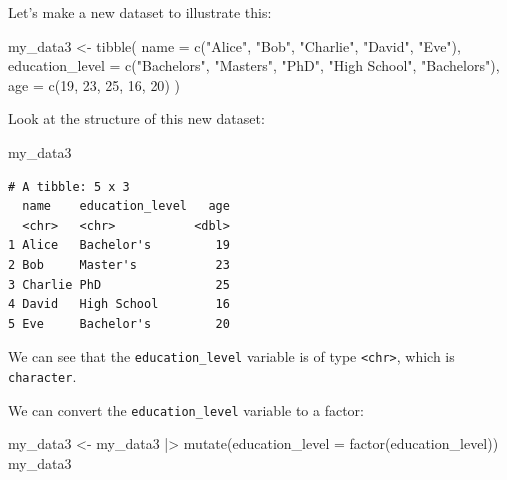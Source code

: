 \documentclass[
  letterpaper,
  8pt,
  a4paper]{book}
\newenvironment{Shaded}{\begin{snugshade}}{\end{snugshade}}
\newcommand{\AttributeTok}[1]{\textcolor[rgb]{0.40,0.45,0.13}{#1}}
\newcommand{\DecValTok}[1]{\textcolor[rgb]{0.68,0.00,0.00}{#1}}
\newcommand{\FunctionTok}[1]{\textcolor[rgb]{0.28,0.35,0.67}{#1}}
\newcommand{\NormalTok}[1]{\textcolor[rgb]{0.00,0.23,0.31}{#1}}
\newcommand{\OtherTok}[1]{\textcolor[rgb]{0.00,0.23,0.31}{#1}}
\newcommand{\SpecialCharTok}[1]{\textcolor[rgb]{0.37,0.37,0.37}{#1}}
\newcommand{\StringTok}[1]{\textcolor[rgb]{0.13,0.47,0.30}{#1}}
\begin{document}
Let's make a new dataset to illustrate this:

\begin{Shaded}
\begin{Highlighting}[]
\NormalTok{my\_data3 }\OtherTok{\textless{}{-}} \FunctionTok{tibble}\NormalTok{(}
  \AttributeTok{name =} \FunctionTok{c}\NormalTok{(}\StringTok{"Alice"}\NormalTok{, }\StringTok{"Bob"}\NormalTok{, }\StringTok{"Charlie"}\NormalTok{, }\StringTok{"David"}\NormalTok{, }\StringTok{"Eve"}\NormalTok{),}
  \AttributeTok{education\_level =} \FunctionTok{c}\NormalTok{(}\StringTok{"Bachelor\textquotesingle{}s"}\NormalTok{, }\StringTok{"Master\textquotesingle{}s"}\NormalTok{, }\StringTok{"PhD"}\NormalTok{, }\StringTok{"High School"}\NormalTok{, }\StringTok{"Bachelor\textquotesingle{}s"}\NormalTok{),}
  \AttributeTok{age =} \FunctionTok{c}\NormalTok{(}\DecValTok{19}\NormalTok{, }\DecValTok{23}\NormalTok{, }\DecValTok{25}\NormalTok{, }\DecValTok{16}\NormalTok{, }\DecValTok{20}\NormalTok{)}
\NormalTok{)}
\end{Highlighting}
\end{Shaded}

Look at the structure of this new dataset:

\begin{Shaded}
\begin{Highlighting}[]
\NormalTok{my\_data3}
\end{Highlighting}
\end{Shaded}

\begin{verbatim}
# A tibble: 5 x 3
  name    education_level   age
  <chr>   <chr>           <dbl>
1 Alice   Bachelor's         19
2 Bob     Master's           23
3 Charlie PhD                25
4 David   High School        16
5 Eve     Bachelor's         20
\end{verbatim}

We can see that the \texttt{education\_level} variable is of type
\texttt{\textless{}chr\textgreater{}}, which is \texttt{character}.

We can convert the \texttt{education\_level} variable to a factor:

\begin{Shaded}
\begin{Highlighting}[]
\NormalTok{my\_data3 }\OtherTok{\textless{}{-}}\NormalTok{ my\_data3 }\SpecialCharTok{|\textgreater{}} 
  \FunctionTok{mutate}\NormalTok{(}\AttributeTok{education\_level =} \FunctionTok{factor}\NormalTok{(education\_level))}
\NormalTok{my\_data3}
\end{Highlighting}
\end{Shaded}
\end{document}
